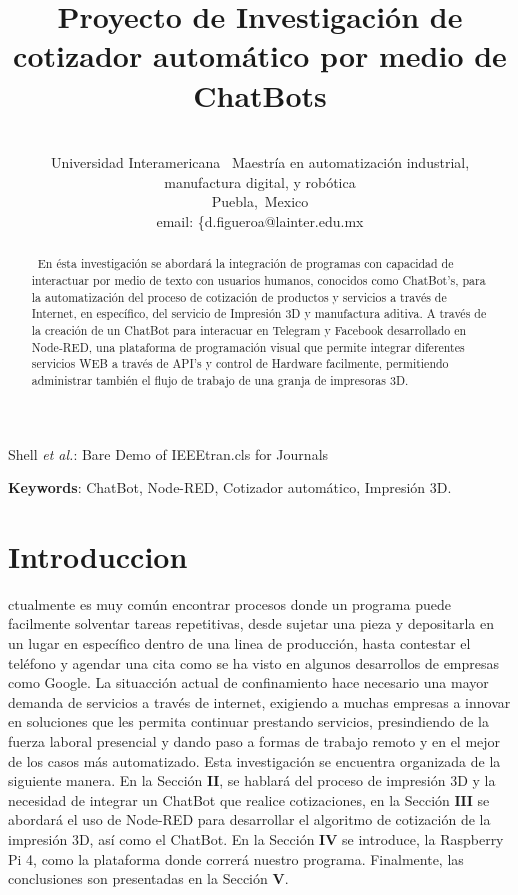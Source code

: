 \documentclass[conference]{IEEEtran}
\begin{document}
\title{Proyecto de Investigación de cotizador automático por medio de ChatBots}
\author
{
\\
\IEEEauthorblockA
{
	Universidad Interamericana~ Maestría en automatización industrial, \\manufactura 		digital, y robótica\\
	Puebla,~Mexico \\
	email: \{d.figueroa@lainter.edu.mx}
}



\markboth{}%
{Shell \MakeLowercase{\textit{et al.}}: Bare Demo of IEEEtran.cls for Journals}

\maketitle


 
\begin{abstract}
 ~En ésta investigación se abordará la integración de programas con capacidad de interactuar por medio de texto con usuarios humanos, conocidos como ChatBot's, para la automatización del proceso de cotización de productos y servicios a través de Internet, en específico, del servicio de Impresión 3D y manufactura aditiva. A través de la creación de un ChatBot para interacuar en Telegram y Facebook desarrollado en Node-RED, una plataforma de programación visual que permite integrar diferentes servicios WEB a través de API's y control de Hardware facilmente, permitiendo administrar también el flujo de trabajo de una granja de impresoras 3D.
\end{abstract}
\vspace{0.5cm}
\textbf{Keywords}:  ChatBot, Node-RED, Cotizador automático, Impresión 3D.

\IEEEpeerreviewmaketitle
\section{Introduccion}
ctualmente es muy común encontrar procesos donde un programa puede facilmente solventar tareas repetitivas, desde sujetar una pieza y depositarla en un lugar en específico dentro de una linea de producción, hasta contestar el teléfono y agendar una cita como se ha visto en algunos desarrollos de empresas como Google. La situacción actual de confinamiento hace necesario una mayor demanda de servicios a través de internet, exigiendo a muchas empresas a innovar en soluciones que les permita continuar prestando servicios, presindiendo de la fuerza laboral presencial y dando paso a formas de trabajo remoto y en el mejor de los casos más automatizado. Esta investigación se encuentra organizada de la siguiente manera. En la Sección $\mathbf{II}$, se hablará del proceso de impresión 3D y la necesidad de integrar un ChatBot que realice cotizaciones, en la Sección $\mathbf{III}$ se abordará el uso de Node-RED para desarrollar el algoritmo de cotización de la impresión 3D, así como el ChatBot. En la Sección $\mathbf{IV}$ se introduce, la Raspberry Pi 4, como la plataforma donde correrá nuestro programa. Finalmente, las conclusiones son presentadas en la Sección $\mathbf{V}$.
\end{document}
